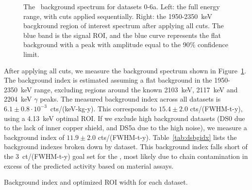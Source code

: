 \documentclass[/main.tex]{subfiles}
\begin{document}
\begin{figure}
  \centering
  \caption[\MJD\ background spectrum]{\label{mjdbgspectrum}
    The \MJD\ background spectrum for datasets 0-6a. Left: the full energy range, with cuts applied sequentially. Right: the 1950-2350~keV bacgkround region of interest spectrum after applying all cuts. The blue band is the signal ROI, and the blue curve represents the flat background with a peak with amplitude equal to the 90\% confidence limit.
  }
\end{figure}
After applying all cuts, we measure the background spectrum shown in Figure~\ref{mjdbgspectrum}.
The background index is estimated assuming a flat background in the 1950-2350~keV range, excluding regions around the known 2103~keV, 2117~keV and 2204~keV $\gamma$ peaks.
The measured background index across all datasets is $6.1\pm0.8\cdot10^{-3}$~cts/(keV-kg-y).
This corresponds to $15.4\pm2.0$ cts/(FWHM-t-y), using a 4.13~keV optimal ROI.
If we exclude high background datasets (DS0 due to the lack of inner copper shield, and DS5a due to the high noise), we measure a background index of $11.9\pm2.0$ cts/(FWHM-t-y).
Table~\ref{tab:dsbgidx} lists the background indexes broken down by dataset.
This background index falls short of the 3~ct/(FWHM-t-y) goal set for the \MJD, most likely due to  chain contamination in excess of the predicted activity based on material assays.
\begin{table}[h]
  \centering
  \caption[Summary of datasets]{\label{tab:dsbgidx}
    Background index and optimized ROI width for each dataset.
  }
  \footnotesize
  
\end{table}
\end{document}
